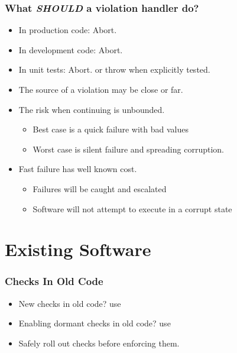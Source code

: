 \begin{frame}[fragile]
  \frametitle{What \emph{SHOULD} a violation handler do?}
  \begin{itemize} \pause
  \item{In production code: Abort.}\pause
  \item{In development code: Abort.} \pause
  \item{In unit tests: Abort. \pause or throw when explicitly tested.} \pause
  \item{The source of a violation may be close or far.} \pause
  \item The risk when continuing is unbounded. \pause
    \begin{itemize}
    \item{Best case is a quick failure with bad values} \pause
    \item{Worst case is silent failure and spreading corruption.} \pause
    \end{itemize} 
  \item Fast failure has well known cost. \pause
    \begin{itemize}
    \item{Failures will be caught and escalated} \pause
    \item{Software will not attempt to execute in a corrupt state} \pause
    \end{itemize} 
  \end{itemize}
\end{frame}

\section{Existing Software}

\begin{frame}[fragile]
  \frametitle{Checks In Old Code}
  \begin{itemize}\pause
  \item{New checks in old code?  use } \pause
  \item{Enabling dormant checks in old code?  use } \pause
  \end{itemize}
  \begin{itemize}
  \item{Safely roll out checks before enforcing them.}
  \end{itemize}
\end{frame}

